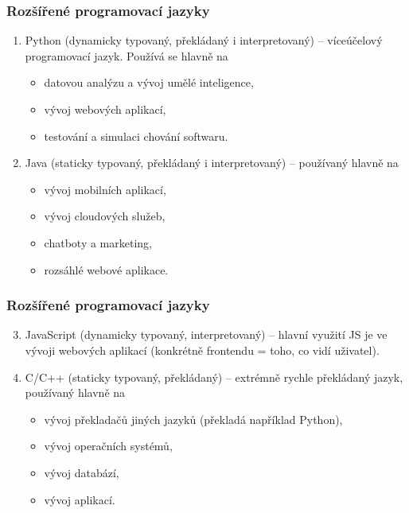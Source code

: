\documentclass[aspectratio=169,11pt,svgnames]{beamer}
\begin{document}
\begin{frame}
 \frametitle{Rozšířené programovací jazyky}
 \begin{enumerate}
  \item \alert{Python} (dynamicky typovaný, překládaný i interpretovaný) --
   víceúčelový programovací jazyk. Používá se hlavně na
   \begin{itemize}
    \item datovou analýzu a vývoj umělé inteligence,
    \item vývoj webových aplikací,
    \item testování a simulaci chování softwaru.
   \end{itemize}
  \pause
  \item \alert{Java} (staticky typovaný, překládaný i interpretovaný) --
   používaný hlavně na
  \begin{itemize}
   \item vývoj mobilních aplikací,
   \item vývoj cloudových služeb,
   \item chatboty a marketing,
   \item rozsáhlé webové aplikace.
  \end{itemize}
 \end{enumerate}
\end{frame}

\begin{frame}
 \frametitle{Rozšířené programovací jazyky}
 \begin{enumerate}
  \setcounter{enumi}{2}
  \item \alert{JavaScript} (dynamicky typovaný, interpretovaný) -- hlavní
   využití JS je ve vývoji webových aplikací (konkrétně frontendu = toho, co vidí
   uživatel).
  \pause
  \item \alert{C/C++} (staticky typovaný, překládaný) -- extrémně rychle
   překládaný jazyk, používaný hlavně na
  \begin{itemize}
   \item vývoj překladačů jiných jazyků (překladá například Python),
   \item vývoj operačních systémů,
   \item vývoj databází,
   \item vývoj aplikací.
  \end{itemize}
 \end{enumerate}
\end{frame}
\end{document}
